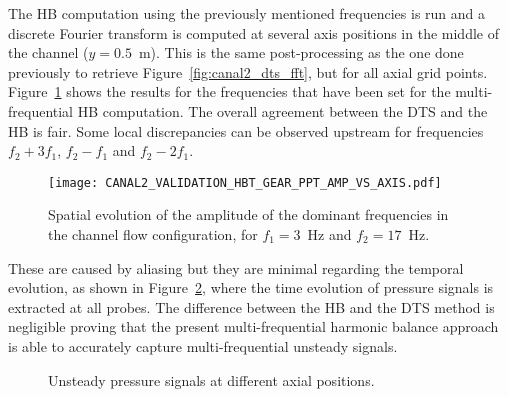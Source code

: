 The HB computation using the previously mentioned frequencies is
run and a discrete Fourier transform is computed at several axis positions
in the middle of the channel ($y=0.5$~m). 
This is the same post-processing as the one done previously to retrieve 
Figure~\ref{fig:canal2_dts_fft}, but for all axial grid points.
Figure~\ref{fig:canal2_validation_hbt_gear_amp_vs_axis}
shows the results for the frequencies that have been set for the 
multi-frequential HB computation.
The overall agreement between the DTS and the HB is fair.  
Some local discrepancies can be
observed upstream for frequencies $f_2 + 3f_1$, $f_2 - f_1$ and $f_2 -
2f_1$. 
\begin{figure}[htp]
  \centering
  \texttt{[image: CANAL2\_VALIDATION\_HBT\_GEAR\_PPT\_AMP\_VS\_AXIS.pdf]}
  \caption{Spatial evolution of the amplitude of the dominant
    frequencies in the channel flow configuration, for $f_1 = 3$~Hz and $f_2 = 17$~Hz.}
  \label{fig:canal2_validation_hbt_gear_amp_vs_axis}
\end{figure}
These are caused by aliasing
but they are minimal regarding the temporal evolution, as
shown in Figure~\ref{fig:canal2_validation_hbt_gear_time_ev}, where the
time evolution of pressure signals is extracted at all probes.  The
difference between the HB and the DTS method is negligible proving
that the present multi-frequential harmonic balance approach is
able to accurately capture multi-frequential unsteady signals.
\begin{figure}[htp]
  \centering 
   \quad{}
  \caption{Unsteady pressure signals at different axial positions.}
  \label{fig:canal2_validation_hbt_gear_time_ev}
\end{figure}
